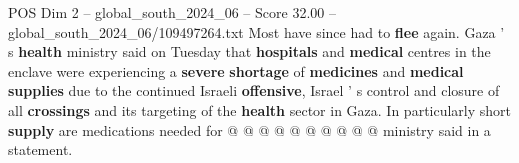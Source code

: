 \begin{textsample}{POS Dim 2 – global\_south\_2024\_06 – Score 32.00 – global\_south\_2024\_06/109497264.txt}
Most have since had to \textbf{flee} again.
Gaza ' s \textbf{health} ministry said on Tuesday that \textbf{hospitals} and \textbf{medical} centres in the enclave were experiencing a \textbf{severe} \textbf{shortage} of \textbf{medicines} and \textbf{medical} \textbf{supplies} due to the continued Israeli \textbf{offensive}, Israel ' s control and closure of all \textbf{crossings} and its targeting of the \textbf{health} sector in Gaza.
In particularly short \textbf{supply} are medications needed for @ @ @ @ @ @ @ @ @ @ ministry said in a statement.

\end{textsample}
